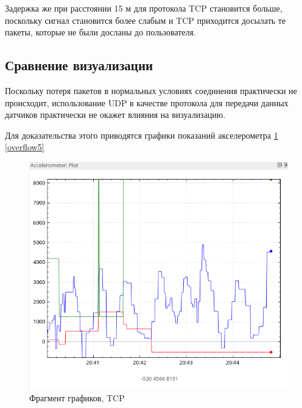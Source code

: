 \documentclass[14pt]{matmex-diploma-custom.cls}
\begin{document}
Задержка же при расстоянии 15 м для протокола TCP становится больше, поскольку сигнал становится более слабым и TCP приходится досылать те пакеты, которые не были досланы до пользователя.
\subsection{Сравнение визуализации}
Поскольку потеря пакетов в нормальных условиях соединения практически не происходит, использование UDP в качестве протокола для передачи данных датчиков практически не окажет влияния на визуализацию.

Для доказательства этого приводятся графики показаний акселерометра \ref{overflow4} \ref{overflow5}

\begin{figure}
\centering
\includegraphics[width=\textwidth]{tcp.png}
\caption{Фрагмент графиков, TCP \label{overflow4}}
\end{figure}
\end{document}
